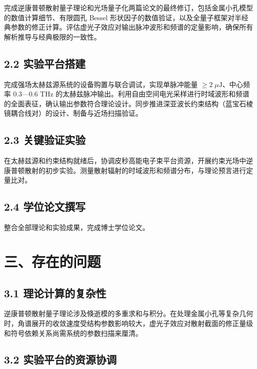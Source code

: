\documentclass[a4paper,12pt]{ctexart}
\begin{document}
完成逆康普顿散射量子理论和光场量子化两篇论文的最终修订，包括金属小孔模型的数值计算细节、有限圆孔 Bessel 形状因子的数值验证，以及全量子框架对半经典参数的修正计算。评估虚光子效应对输出脉冲波形和频谱的定量影响，确保所有解析推导与经典极限的一致性。

\subsection{2.2 实验平台搭建}

完成强场太赫兹源系统的设备购置与联合调试，实现单脉冲能量 $\geq 2\;\mu\text{J}$、中心频率 0.3—0.6 THz 的太赫兹脉冲输出。利用自由空间电光采样进行时域波形和频谱的全面表征，确认输出参数符合理论设计。同步推进深亚波长约束结构（蓝宝石棱镜耦合线对）的设计、制备与近场扫描验证。

\subsection{2.3 关键验证实验}

在太赫兹源和约束结构就绪后，协调皮秒高能电子束平台资源，开展约束光场中逆康普顿散射的初步实验。测量散射辐射的时域波形和频谱分布，与理论预言进行定量比对。

\subsection{2.4 学位论文撰写}

整合全部理论和实验成果，完成博士学位论文。

\section{三、存在的问题}

\subsection{3.1 理论计算的复杂性}

逆康普顿散射量子理论涉及倏逝模的多重求和与积分。在处理金属小孔等复杂几何时，角谱展开的收敛速度受结构参数影响较大，虚光子效应对散射截面的修正量级和符号依赖关系尚需系统的参数扫描来厘清。

\subsection{3.2 实验平台的资源协调}
\end{document}
